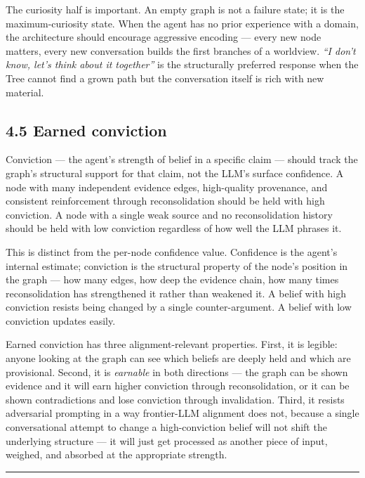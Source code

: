 \documentclass[12pt]{article}
\begin{document}
The curiosity half is important. An empty graph is not a failure state; it is the maximum-curiosity state. When the agent has no prior experience with a domain, the architecture should encourage aggressive encoding --- every new node matters, every new conversation builds the first branches of a worldview. \emph{``I don't know, let's think about it together''} is the structurally preferred response when the Tree cannot find a grown path but the conversation itself is rich with new material.

\subsection{4.5 Earned conviction}\label{earned-conviction}

Conviction --- the agent's strength of belief in a specific claim --- should track the graph's structural support for that claim, not the LLM's surface confidence. A node with many independent evidence edges, high-quality provenance, and consistent reinforcement through reconsolidation should be held with high conviction. A node with a single weak source and no reconsolidation history should be held with low conviction regardless of how well the LLM phrases it.

This is distinct from the per-node confidence value. Confidence is the agent's internal estimate; conviction is the structural property of the node's position in the graph --- how many edges, how deep the evidence chain, how many times reconsolidation has strengthened it rather than weakened it. A belief with high conviction resists being changed by a single counter-argument. A belief with low conviction updates easily.

Earned conviction has three alignment-relevant properties. First, it is legible: anyone looking at the graph can see which beliefs are deeply held and which are provisional. Second, it is \emph{earnable} in both directions --- the graph can be shown evidence and it will earn higher conviction through reconsolidation, or it can be shown contradictions and lose conviction through invalidation. Third, it resists adversarial prompting in a way frontier-LLM alignment does not, because a single conversational attempt to change a high-conviction belief will not shift the underlying structure --- it will just get processed as another piece of input, weighed, and absorbed at the appropriate strength.

\begin{center}\rule{0.5\linewidth}{0.5pt}\end{center}
\end{document}
